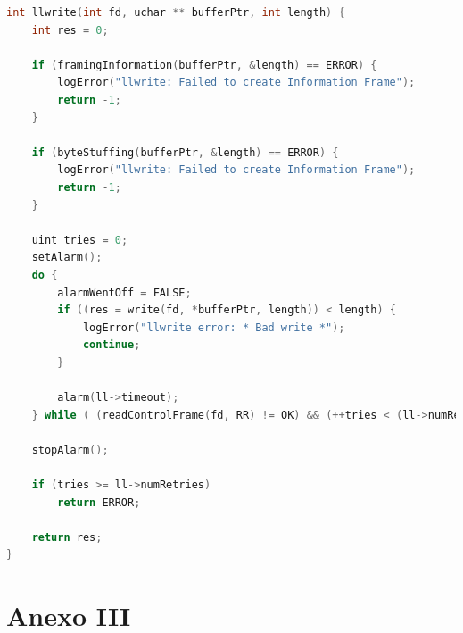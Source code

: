 \documentclass[a4paper, 11pt]{article}
\begin{document}
\begin{lstlisting}[caption = llwrite, language=C]
int llwrite(int fd, uchar ** bufferPtr, int length) {
	int res = 0;

	if (framingInformation(bufferPtr, &length) == ERROR) {
		logError("llwrite: Failed to create Information Frame");
		return -1;
	}

	if (byteStuffing(bufferPtr, &length) == ERROR) {
		logError("llwrite: Failed to create Information Frame");
		return -1;
	}

	uint tries = 0;
	setAlarm();
	do {
		alarmWentOff = FALSE;
		if ((res = write(fd, *bufferPtr, length)) < length) {
			logError("llwrite error: * Bad write *");
			continue;
		}

		alarm(ll->timeout);
	} while ( (readControlFrame(fd, RR) != OK) && (++tries < (ll->numRetries)));

	stopAlarm();

	if (tries >= ll->numRetries)
		return ERROR;
		
	return res;
}
\end{lstlisting}

\newpage

\section{Anexo III}
\end{document}
